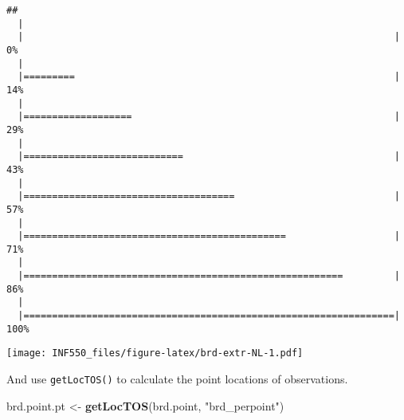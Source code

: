 \documentclass[]{book}
\newenvironment{Shaded}{\begin{snugshade}}{\end{snugshade}}
\newcommand{\CommentTok}[1]{\textcolor[rgb]{0.56,0.35,0.01}{\textit{#1}}}
\newcommand{\DataTypeTok}[1]{\textcolor[rgb]{0.13,0.29,0.53}{#1}}
\newcommand{\FloatTok}[1]{\textcolor[rgb]{0.00,0.00,0.81}{#1}}
\newcommand{\KeywordTok}[1]{\textcolor[rgb]{0.13,0.29,0.53}{\textbf{#1}}}
\newcommand{\NormalTok}[1]{#1}
\newcommand{\OperatorTok}[1]{\textcolor[rgb]{0.81,0.36,0.00}{\textbf{#1}}}
\newcommand{\StringTok}[1]{\textcolor[rgb]{0.31,0.60,0.02}{#1}}
\begin{document}
\begin{verbatim}
## 
  |                                                                       
  |                                                                 |   0%
  |                                                                       
  |=========                                                        |  14%
  |                                                                       
  |===================                                              |  29%
  |                                                                       
  |============================                                     |  43%
  |                                                                       
  |=====================================                            |  57%
  |                                                                       
  |==============================================                   |  71%
  |                                                                       
  |========================================================         |  86%
  |                                                                       
  |=================================================================| 100%
\end{verbatim}

\begin{Shaded}
\end{Shaded}

\texttt{[image: INF550\_files/figure-latex/brd-extr-NL-1.pdf]}

And use \texttt{getLocTOS()} to calculate the point locations of observations.

\begin{Shaded}
\begin{Highlighting}[]
\NormalTok{brd.point.pt <-}\StringTok{ }\KeywordTok{getLocTOS}\NormalTok{(brd.point, }\StringTok{"brd_perpoint"}\NormalTok{)}
\end{Highlighting}
\end{Shaded}
\end{document}
